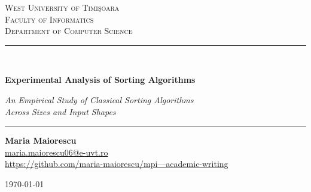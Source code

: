 \documentclass[11pt,a4paper]{article}
\begin{document}
\begin{titlepage}
  \thispagestyle{empty}
  \centering

  \vspace*{1.5cm}

  {\small\scshape West University of Timi\c{s}oara}\\[0.35cm]
  {\small\scshape Faculty of Informatics}\\[0.25cm]
  {\small\scshape Department of Computer Science}

  \vspace{2.5cm}

  \rule{\linewidth}{0.5pt}\\[0.8cm]
  {\LARGE\bfseries Experimental Analysis of Sorting Algorithms\par}
  \vspace{0.55cm}
  {\large\itshape An Empirical Study of Classical Sorting Algorithms\\[0.15cm] Across Sizes and Input Shapes\par}
  \vspace{0.6cm}
  \rule{\linewidth}{0.5pt}

  \vspace{3cm}

  {\large\textbf{Maria Maiorescu}}\\[0.4cm]
  {\small\href{mailto:maria.maiorescu06@e-uvt.ro}{maria.maiorescu06@e-uvt.ro}}\\[0.2cm]
   {\small\href{https://github.com/maria-maiorescu/mpi---academic-writing}{https://github.com/maria-maiorescu/mpi---academic-writing}}

  \vfill

  {\large \today}

  \vspace*{1cm}
\end{titlepage}
\end{document}
